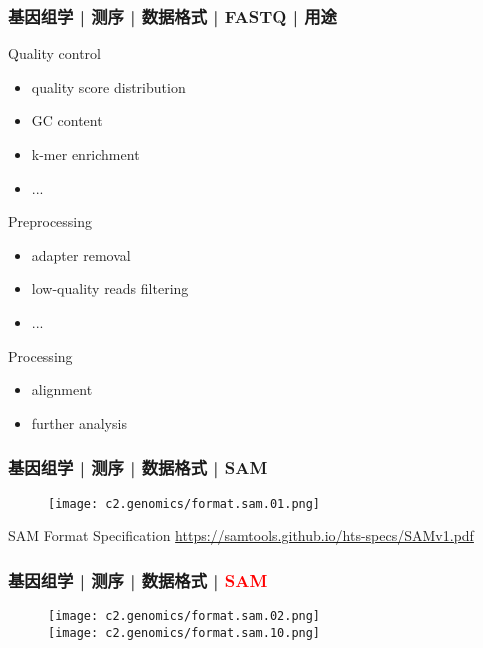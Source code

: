 \begin{frame}
  \frametitle{基因组学 | 测序 | 数据格式 | FASTQ | 用途}
  \begin{block}{Quality control}
    \begin{itemize}
      \item quality score distribution
      \item GC content
      \item k-mer enrichment
      \item ...
    \end{itemize}
  \end{block}
  \pause
  \begin{block}{Preprocessing}
    \begin{itemize}
      \item adapter removal
      \item low-quality reads filtering
      \item ...
    \end{itemize}
  \end{block}
  \pause
  \begin{block}{Processing}
    \begin{itemize}
      \item alignment
      \item further analysis
    \end{itemize}
  \end{block}
\end{frame}

\begin{frame}
  \frametitle{基因组学 | 测序 | 数据格式 | SAM}
  \begin{figure}
    \centering
    \texttt{[image: c2.genomics/format.sam.01.png]}
  \end{figure}
  \begin{block}{SAM Format Specification}
    \href{https://samtools.github.io/hts-specs/SAMv1.pdf}{https://samtools.github.io/hts-specs/SAMv1.pdf}
  \end{block}
\end{frame}

\begin{frame}
  \frametitle{基因组学 | 测序 | 数据格式 | \textcolor{red}{SAM}}
  \begin{figure}
    \centering
    \texttt{[image: c2.genomics/format.sam.02.png]}\\
    \vspace{1em}
    \texttt{[image: c2.genomics/format.sam.10.png]}
  \end{figure}
\end{frame}


